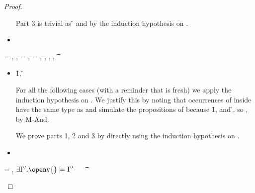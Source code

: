 \begin{lemma}
\begin{proof}
\begin{case}[T-If]
\begin{itemize}
\begin{subcase}[B-IfFalse]
              Part 3 is trivial as
              \opsem {\openv{}} {} {\v{}}
              and {\judgementtwo{}{\v{}}{\t{}}} by the induction hypothesis on {}.
      \end{subcase}
    \item[]
      \begin{subcase}[BE-If]
      \end{subcase}
  \end{itemize}
\end{case}

\begin{case}[T-Let]
  \e{} = { {} {}},
  \judgement {\propenv{}} {} {\s{}} { {}}
             {},
             \propp{} = {\impprop {\notprop {\falsy{}} {\x{}}} {}},
             \proppp{} = {\impprop {\isprop {\falsy{}} {\x{}}} {}},
  \judgement
       {\propenv{}, {\isprop {\s{}} {\x{}}},
         {\propp{}},
         {\proppp{}}}
             {} {\t{}} {\filterset {\thenprop {\prop{}}} {\elseprop {\prop{}}}}
             {\object{}} 


  \begin{itemize}
    \item[]
      \begin{subcase}[B-Let]
        \opsem {\openv{}} {} {\v{1}},
         {} {\v{}}

        For all the following cases (with a reminder that \x{} is fresh)
        we apply the induction hypothesis on . We justify this by noting
        that occurrences of \x{} inside  have the same type as  and 
        simulate the propositions of 
        because 
        \opsem {\openv{}} {} {\v{1}},
        and
         {} {\v{}},
        so \satisfies{\openv{}}{\propenv{}, {\isprop {\s{}} {\x{}}}, \propp{}, \proppp{}},
        by M-And.

        We prove parts 1, 2 and 3 by directly using the induction hypothesis on .
      \end{subcase}
    \item[]
      \begin{subcase}[BE-Let]
      \end{subcase}
  \end{itemize}
\end{case}

\begin{case}[T-Clos] \e{} = {\closure {\openv{}} {\abs {\x{}} {\s{}} {}}},
  {\thenprop {\prop{}}}
  $\exists {\propenvp{}}. \satisfies{\openv{}}{\propenvp{}}$
  \ \ 
\judgement {\propenvp{}} {\abs {\x{}} {\s{}} {}} {\t{}}
                 {\filterset {\thenprop {\prop{}}}
                             {\elseprop {\prop{}}}}
                 {\object{}}


\end{case}
\end{proof}
\end{lemma}
